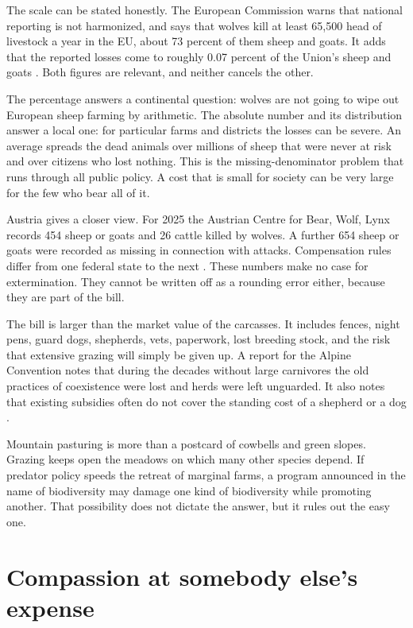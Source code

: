 \documentclass[12pt,a4paper]{book}
\begin{document}
The scale can be stated honestly. The European Commission warns that national reporting is not harmonized, and says that wolves kill at least 65,500 head of livestock a year in the EU, about 73 percent of them sheep and goats. It adds that the reported losses come to roughly 0.07 percent of the Union's sheep and goats \cite{ECLargeCarnivoreFacts2026}. Both figures are relevant, and neither cancels the other.

The percentage answers a continental question: wolves are not going to wipe out European sheep farming by arithmetic. The absolute number and its distribution answer a local one: for particular farms and districts the losses can be severe. An average spreads the dead animals over millions of sheep that were never at risk and over citizens who lost nothing. This is the missing-denominator problem that runs through all public policy. A cost that is small for society can be very large for the few who bear all of it.

Austria gives a closer view. For 2025 the Austrian Centre for Bear, Wolf, Lynx records 454 sheep or goats and 26 cattle killed by wolves. A further 654 sheep or goats were recorded as missing in connection with attacks. Compensation rules differ from one federal state to the next \cite{AustrianCarnivoreLosses2025}. These numbers make no case for extermination. They cannot be written off as a rounding error either, because they are part of the bill.

The bill is larger than the market value of the carcasses. It includes fences, night pens, guard dogs, shepherds, vets, paperwork, lost breeding stock, and the risk that extensive grazing will simply be given up. A report for the Alpine Convention notes that during the decades without large carnivores the old practices of coexistence were lost and herds were left unguarded. It also notes that existing subsidies often do not cover the standing cost of a shepherd or a dog \cite{AlpineConventionCarnivorePrevention2024}.

Mountain pasturing is more than a postcard of cowbells and green slopes. Grazing keeps open the meadows on which many other species depend. If predator policy speeds the retreat of marginal farms, a program announced in the name of biodiversity may damage one kind of biodiversity while promoting another. That possibility does not dictate the answer, but it rules out the easy one.

\section{Compassion at somebody else's expense}
\end{document}
